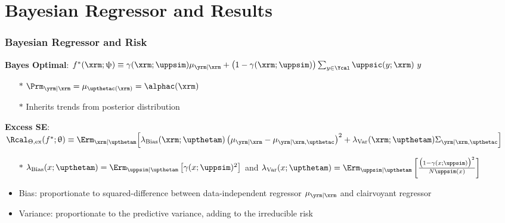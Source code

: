 \documentclass[aspectratio=169]{beamer}
\begin{document}
\section{Bayesian Regressor and Results}


\begin{frame}
\frametitle{Bayesian Regressor and Risk}

\textbf{Bayes Optimal}: $f^*(\xrm;\uppsi) \equiv \gamma(\xrm; \uppsim) \mu_{\yrm | \xrm} + \big(1-\gamma(\xrm; \uppsim)\big) \sum_{y \in \Ycal} \uppsic(y;\xrm) \ y$
\begin{itemize}
\item[$*$] $\Prm_{\yrm | \xrm} = \mu_{\upthetac(\xrm)} = \alphac(\xrm)$ 
\item[$*$] Inherits trends from posterior distribution
\end{itemize}

\hrulefill
\vspace{1.5em}

\textbf{Excess SE}: $\Rcal_{\Theta, \mathrm{ex}}(f^* ; \uptheta) \equiv \Erm_{\xrm | \upthetam}\Big[ \lambda_{\text{Bias}}(\xrm; \upthetam) \left( \mu_{\yrm | \xrm} - \mu_{\yrm | \xrm,\upthetac} \right)^2 + \lambda_{\text{Var}}(\xrm; \upthetam) \Sigma_{\yrm | \xrm,\upthetac} \Big]$
\begin{itemize}
\item[$*$] \footnotesize $\lambda_{\text{Bias}}(x; \upthetam) = \Erm_{\uppsim | \upthetam}\left[ \gamma(x; \uppsim)^2 \right]$ and $\lambda_{\text{Var}}(x; \upthetam) = \Erm_{\uppsim | \upthetam}\left[ \frac{\big( 1 - \gamma(x; \uppsim) \big)^2}{N \uppsim(x)} \right]$ \normalsize
\end{itemize}

\begin{itemize}
\item \alert{Bias}: proportionate to squared-difference between data-independent regressor $\mu_{\yrm | \xrm}$ and clairvoyant regressor
\item \alert{Variance}: proportionate to the predictive variance, adding to the irreducible risk
\end{itemize}

\end{frame}
\end{document}
